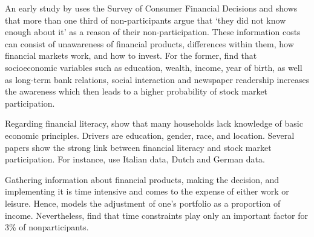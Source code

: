 \documentclass[ProjectABM]{subfiles}
\begin{document}
An early study by \cite{king_leape_1987asset} uses the Survey of Consumer Financial Decisions and shows that more than one third of non-participants argue that `they did not know enough about it' as a reason of their non-participation. These information costs can consist of unawareness of financial products, differences within them, how financial markets work, and how to invest. %
For the former, \cite{guiso_jappelli_2005} find that socioeconomic variables such as education, wealth, income, year of birth, as well as long-term bank relations, social interaction and newspaper readership increases the awareness which then leads to a higher probability of stock market participation. 

Regarding financial literacy, \cite{lusardi_mitchell_2011financial_literacy} show that many households lack knowledge of basic economic principles. Drivers are education, gender, race, and location. %
Several papers show the strong link between financial literacy and stock market participation. For instance, \cite{guiso_japelli_2002household_book} use Italian data, \cite{hochguertel_et_al_2002household,vanrooij_et_al_2011} Dutch and \cite{borsch_eymann_2000household} German data.

Gathering information about financial products, making the decision, and implementing it is time intensive and comes to the expense of either work or leisure. Hence, \cite{bonaparte_et_al_2012adjustment} models the adjustment of one's portfolio as a proportion of income. Nevertheless, \cite{choi_2020} find that time constraints play only an important factor for 3\% of nonparticipants. %
\end{document}
